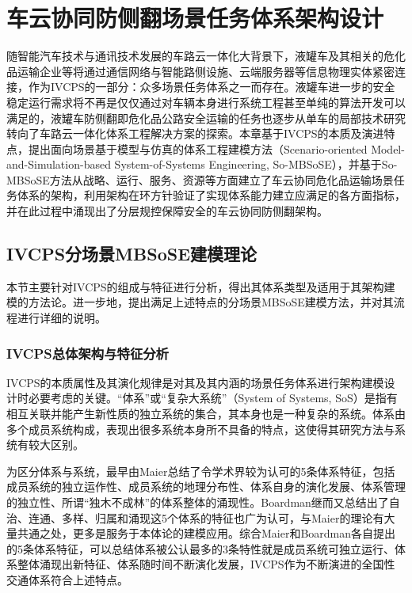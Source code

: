 
\chapter{车云协同防侧翻场景任务体系架构设计}
\label{chap:architecture}

随智能汽车技术与通讯技术发展的车路云一体化大背景下，液罐车及其相关的危化品运输企业等将通过通信网络与智能路侧设施、云端服务器等信息物理实体紧密连接，作为IVCPS的一部分：众多场景任务体系之一而存在。液罐车进一步的安全稳定运行需求将不再是仅仅通过对车辆本身进行系统工程甚至单纯的算法开发可以满足的，液罐车防侧翻即危化品公路安全运输的任务也逐步从单车的局部技术研究转向了车路云一体化体系工程解决方案的探索。本章基于IVCPS的本质及演进特点，提出面向场景基于模型与仿真的体系工程建模方法（Scenario-oriented Model-and-Simulation-based System-of-Systems Engineering, So-MBSoSE），并基于So-MBSoSE方法从战略、运行、服务、资源等方面建立了车云协同危化品运输场景任务体系的架构，利用架构在环方针验证了实现体系能力建立应满足的各方面指标，并在此过程中涌现出了分层规控保障安全的车云协同防侧翻架构。 %


\section{IVCPS分场景MBSoSE建模理论}

  本节主要针对IVCPS的组成与特征进行分析，得出其体系类型及适用于其架构建模的方法论。进一步地，提出满足上述特点的分场景MBSoSE建模方法，并对其流程进行详细的说明。

  \subsection{IVCPS总体架构与特征分析}

    IVCPS的本质属性及其演化规律是对其及其内涵的场景任务体系进行架构建模设计时必要考虑的关键。“体系”或“复杂大系统”（System of Systems, SoS）是指有相互关联并能产生新性质的独立系统的集合，其本身也是一种复杂的系统\cite{fengyimin2024soseframework}。体系由多个成员系统构成，表现出很多系统本身所不具备的特点，这使得其研究方法与系统有较大区别。

    为区分体系与系统，最早由Maier总结了令学术界较为认可的5条体系特征\cite{maier1996sosprinciples}，包括成员系统的独立运作性、成员系统的地理分布性、体系自身的演化发展、体系管理的独立性、所谓“独木不成林”的体系整体的涌现性。Boardman继而又总结出了自治、连通、多样、归属和涌现这5个体系的特征\cite{boardman2006meaningof}也广为认可，与Maier的理论有大量共通之处，更多是服务于本体论的建模应用。综合Maier和Boardman各自提出的5条体系特征，可以总结体系被公认最多的3条特性就是成员系统可独立运行、体系整体涌现出新特征、体系随时间不断演化发展，IVCPS作为不断演进的全国性交通体系符合上述特点。

